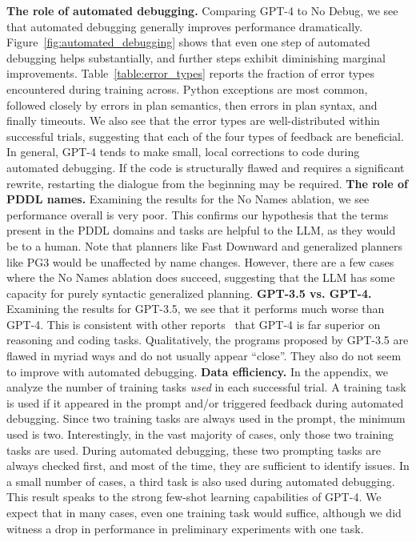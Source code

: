 \documentclass[letterpaper]{article} %
\begin{document}
\textbf{The role of automated debugging.}
Comparing GPT-4 to No Debug, we see that automated debugging generally improves performance dramatically.
Figure~\ref{fig:automated_debugging} shows that even one step of automated debugging helps substantially, and further steps exhibit diminishing marginal improvements.
Table~\ref{table:error_types} reports the fraction of error types encountered during training across.
Python exceptions are most common, followed closely by errors in plan semantics, then errors in plan syntax, and finally timeouts.
We also see that the error types are well-distributed within successful trials, suggesting that each of the four types of feedback are beneficial.
In general, GPT-4 tends to make small, local corrections to code during automated debugging.
If the code is structurally flawed and requires a significant rewrite, restarting the dialogue from the beginning may be required.  \textbf{The role of PDDL names.}
Examining the results for the No Names ablation, we see performance overall is very poor.
This confirms our hypothesis that the terms present in the PDDL domains and tasks are helpful to the LLM, as they would be to a human.
Note that planners like Fast Downward and generalized planners like PG3 would be unaffected by name changes.
However, there are a few cases where the No Names ablation does succeed, suggesting that the LLM has some capacity for purely syntactic generalized planning.  \textbf{GPT-3.5 vs. GPT-4.}
Examining the results for GPT-3.5, we see that it performs much worse than GPT-4.
This is consistent with other reports~\cite{openai2023gpt4,bubeck2023sparks} that GPT-4 is far superior on reasoning and coding tasks.
Qualitatively, the programs proposed by GPT-3.5 are flawed in myriad ways and do not usually appear ``close''.
They also do not seem to improve with automated debugging.  \textbf{Data efficiency.}
In the appendix, we analyze the number of training tasks \emph{used} in each successful trial.
A training task is used if it appeared in the prompt and/or triggered feedback during automated debugging.
Since two training tasks are always used in the prompt, the minimum used is two.
Interestingly, in the vast majority of cases, only those two training tasks are used.
During automated debugging, these two prompting tasks are always checked first, and most of the time, they are sufficient to identify issues.
In a small number of cases, a third task is also used during automated debugging.
This result speaks to the strong few-shot learning capabilities of GPT-4.
We expect that in many cases, even one training task would suffice, although we did witness a drop in performance in preliminary experiments with one task.
\end{document}
